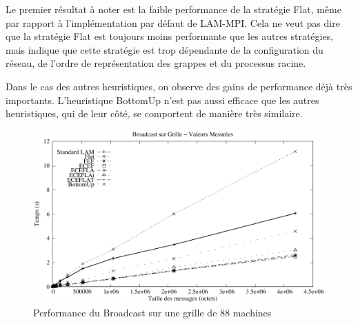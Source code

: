 
Le premier résultat à noter est la faible performance de la stratégie
Flat, même par rapport à l'implémentation par défaut de LAM-MPI. Cela
ne veut pas dire que la stratégie Flat est toujours moins performante
que les autres stratégies, mais indique que cette stratégie est trop
dépendante de la configuration du réseau, de l'ordre de représentation
des grappes et du processus racine.

Dans le cas des autres heuristiques, on observe des gains de performance
déjà très importants. L'heuristique BottomUp %
n'est pas aussi efficace que les autres heuristiques,
qui de leur côté, se comportent de manière très similaire.

%
\begin{figure}[h]
	\begin{centering}
		\includegraphics[width=0.8\linewidth]{images/Grid/Bcast/case1/comp}
		\par\end{centering}
	
	\caption{\label{Figure: Bcast - Case1 - Mesure}Performance du Broadcast sur
		une grille de 88 machines }
	
\end{figure}


